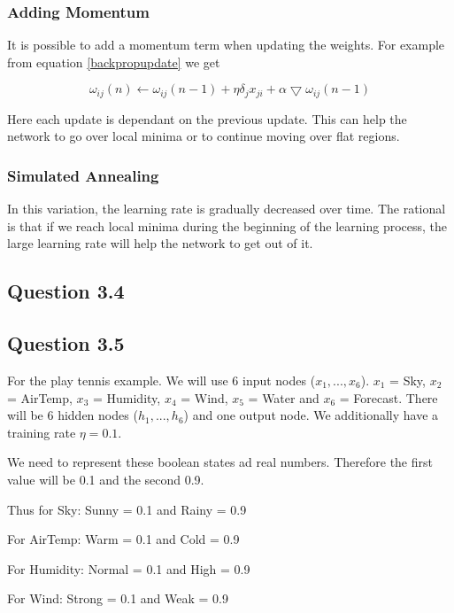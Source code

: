 \documentclass[10pt,a4paper]{article}
\begin{document}
\subsubsection{Adding Momentum}

It is possible to add a momentum term when updating the weights. For example from equation \ref{backpropupdate} we get

\begin{equation}
\omega_{ij}(n) \leftarrow \omega_{ij}(n-1) + \eta \delta_j x_{ji} + \alpha\bigtriangledown\omega_{ij}(n-1)
\end{equation}

Here each update is dependant on the previous update. This can help the network to go over local minima or to continue moving over flat regions. \citep[p100]{Michell2009}

\subsubsection{Simulated Annealing}

In this variation, the learning rate is gradually decreased over time. The rational is that if we reach local minima during the beginning of the learning process, the large learning rate will help the network to get out of it. \citep{nils}
\subsection{Question 3.4}

\subsection{Question 3.5}

For the play tennis example. We will use 6 input nodes ($x_1,...,x_6$). $x_1$ = Sky, $x_2$ = AirTemp, $x_3$ = Humidity, $x_4$ = Wind, $x_5$ = Water and $x_6$ = Forecast. There will be 6 hidden nodes ($h_1,...,h_6$) and one output node. We additionally have a training rate $\eta = 0.1$.

We need to represent these boolean states ad real numbers. Therefore the first value will be 0.1 and the second 0.9. 

Thus for Sky: Sunny = 0.1 and Rainy = 0.9 

For AirTemp: Warm = 0.1 and Cold = 0.9

For Humidity: Normal = 0.1 and High = 0.9

For Wind: Strong = 0.1 and Weak = 0.9
\end{document}
